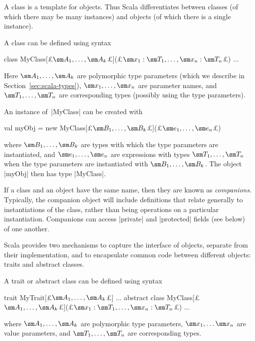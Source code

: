 
A class is a template for objects.  Thus Scala differentiates between classes
(of which there may be many instances) and objects (of which there is a single
instance).

A class can be defined using syntax
\begin{scala}
  class MyClass[£$\sm A_1, \ldots, \sm A_k$£](£$\sm x_1: \sm T_1, \ldots, \sm x_n: \sm T_n$£){ ... } 
\end{scala}
Here $\sm A_1, \ldots, \sm A_k$ are polymorphic type parameters (which we
describe in Section~\ref{sec:scala-types}), $\sm
x_1,\linebreak[1] \ldots,\linebreak[1] \sm x_n$ are parameter names, and $\sm
T_1, \ldots, \sm T_n$ are corresponding types (possibly using the type
parameters).

An instance of~|MyClass| can be created with
\begin{scala}
  val myObj = new MyClass[£$\sm B_1, \ldots, \sm B_k$£](£$\sm e_1, \ldots, \sm e_n$£)
\end{scala}
where $\sm B_1, \ldots, \sm B_k$ are types with which the type parameters are
instantiated, and $\sm e_1, \ldots, \sm e_n$ are expressions with types $\sm
T_1, \ldots, \sm T_n$ when the type parameters are instantiated with $\sm B_1,
\ldots, \sm B_k$.  The object |myObj| then has type |MyClass|.



If a class and an object have the same name, then they are known as
\emph{companions}.  Typically, the companion object will
include definitions that relate generally to instantiations of the class,
rather than being operations on a particular instantiation.
%
Companions can access |private| and
|protected| fields (see below) of one another.


Scala provides two mechanisms to capture the interface of objects, separate
from their implementation, and to encapsulate common code between different
objects: traits and abstract classes.

A trait or abstract class  can be defined using
syntax  
\begin{scala}
  trait MyTrait[£$\sm A_1, \ldots, \sm A_k$£]{ ... }
  abstract class MyClass[£$\sm A_1, \ldots, \sm A_k$£](£$\sm x_1: \sm T_1, \ldots, \sm x_n: \sm T_n$£){ ... } 
\end{scala}
where $\sm A_1, \ldots, \sm A_k$ are polymorphic type
parameters, $\sm x_1, \ldots \sm x_n$ are value
parameters, and $\sm T_1, \ldots, \sm T_n$ are
corresponding types.

